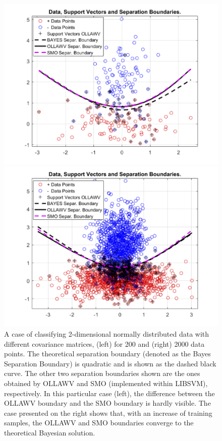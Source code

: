 \documentclass[reqno]{vcuthesis}
\numberwithin{equation}{chapter}
\begin{document}
\begin{figure}[t!]
\centering
\begin{minipage}{0.49\textwidth}
\includegraphics[width=\textwidth]{figures/OLLAWVSeparation.png}
\end{minipage}
\begin{minipage}{0.49\textwidth}
\includegraphics[width=\textwidth]{figures/SeparationOLLAWV2000.png}
\end{minipage}
\caption{A case of classifying 2-dimensional normally distributed data with different covariance matrices, (left) for 200 and (right) 2000 data points. The theoretical separation boundary (denoted as the Bayes Separation Boundary) is quadratic and is shown as the dashed black curve. The other two separation boundaries shown are the ones obtained by OLLAWV and SMO (implemented within LIBSVM), respectively. In this particular case (left), the difference between the OLLAWV boundary and the SMO boundary is hardly visible. The case presented on the right shows that, with an increase of training samples, the OLLAWV and SMO boundaries converge to the theoretical Bayesian solution.}
\label{fig:ollawvseparation}
\end{figure}
\end{document}
